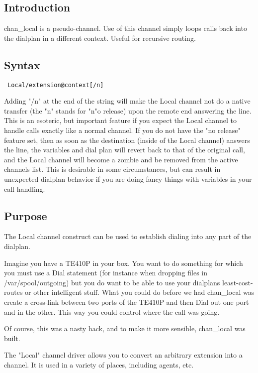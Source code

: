 \subsection{Introduction}

chan\_local is a pseudo-channel. Use of this channel simply loops calls back into the dialplan in a different context. Useful for recursive routing.

\subsection{Syntax}
\begin{verbatim}
 Local/extension@context[/n]
\end{verbatim}

Adding "/n" at the end of the string will make the Local channel not do a native transfer (the "n" stands for "n"o release) upon the remote end answering the line. This is an esoteric, but important feature if you expect the Local channel to handle calls exactly like a normal channel. If you do not have the "no release" feature set, then as soon as the destination (inside of the Local channel) answers the line, the variables and dial plan will revert back to that of the original call, and the Local channel will become a zombie and be removed from the active channels list. This is desirable in some circumstances, but can result in unexpected dialplan behavior if you are doing fancy things with variables in your call handling.

\subsection{Purpose}

The Local channel construct can be used to establish dialing into any part of the dialplan.

Imagine you have a TE410P in your box. You want to do something for which you must use a Dial statement (for instance when dropping files in /var/spool/outgoing) but you do want to be able to use your dialplans least-cost-routes or other intelligent stuff. What you could do before we had chan\_local was create a cross-link between two ports of the TE410P and then Dial out one port and in the other. This way you could control where the call was going.

Of course, this was a nasty hack, and to make it more sensible, chan\_local was built.

The "Local" channel driver allows you to convert an arbitrary extension into a channel. It is used in a variety of places, including agents, etc.

